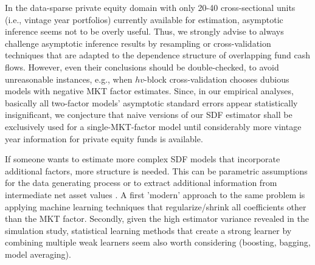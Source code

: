 \documentclass[12pt]{article}
\begin{document}
In the data-sparse private equity domain with only 20-40 cross-sectional units (i.e., vintage year portfolios) currently available for estimation, asymptotic inference seems not to be overly useful.
Thus, we strongly advise to always challenge asymptotic inference results by resampling or cross-validation techniques that are adapted to the dependence structure of overlapping fund cash flows.
However, even their conclusions should be double-checked, to avoid unreasonable instances, e.g., when $hv$-block cross-validation chooses dubious models with negative MKT factor estimates.
Since, in our empirical analyses, basically all two-factor models' asymptotic standard errors appear statistically insignificant, we conjecture that naive versions of our SDF estimator shall be exclusively used for a single-MKT-factor model until considerably more vintage year information for private equity funds is available.

If someone wants to estimate more complex SDF models that incorporate additional factors, more structure is needed.
This can be parametric assumptions for the data generating process \citep{ACGP18} or to extract additional information from intermediate net asset values \citep{GSW19,BGG20}.
A first 'modern' approach to the same problem is applying machine learning techniques that regularize/shrink all coefficients other than the MKT factor.
Secondly, given the high estimator variance revealed in the simulation study, statistical learning methods that create a strong learner by combining multiple weak learners seem also worth considering (boosting, bagging, model averaging).









\newpage
\end{document}
